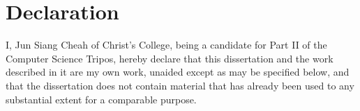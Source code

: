 \documentclass[final,dissertation.tex]{subfiles}
\begin{document}
\section*{Declaration}

I, Jun Siang Cheah of Christ's College, being a candidate for Part II of the Computer
Science Tripos, hereby declare that this dissertation and the work described in it are my own work,
unaided except as may be specified below, and that the dissertation
does not contain material that has already been used to any substantial
extent for a comparable purpose.

\bigskip

\par\noindent{} \hfill\makebox[2.0in]{\today}%
\vspace{-15pt}
\par\noindent\makebox[2.5in]{\hrulefill} \hfill\makebox[2.0in]{\hrulefill}%
\par\noindent{}      \hfill{}%
\end{document}
